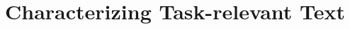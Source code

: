 \setcounter{chapter}{2}


\chapter{Characterizing Task-relevant Text}
\label{ch:characterizing}



\clearpage


